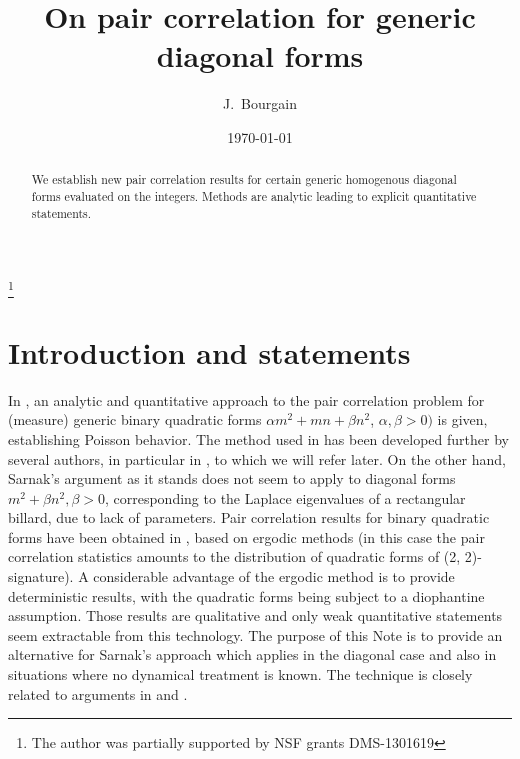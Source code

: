 \documentclass[12, eqno]{amsart}
\numberwithin{equation}{section}
\theoremstyle{remark}
\begin{document}
\title{On pair correlation for generic diagonal forms}
\date{\today}
\author{J.~Bourgain}
\address{J.~Bourgain, Institute for Advanced Study, Princeton, NJ 08540}
\thanks{The author was partially supported by NSF grants DMS-1301619}

\begin{abstract}
We establish new pair correlation results for certain generic homogenous diagonal forms evaluated on the integers. 
Methods are analytic leading to explicit quantitative statements.
\end{abstract}
\maketitle
\section {Introduction and statements}

In \cite {S}, an analytic and quantitative approach to the pair correlation problem for (measure) generic binary 
quadratic forms $\alpha m^2+mn+ \beta n^2$, $\alpha, \beta>0)$ is given, establishing Poisson behavior.
The method used in \cite {S}  has been developed further by several authors, in particular in \cite {V}, to which we will refer later.
On the other hand, Sarnak's argument as it stands does not seem to apply to diagonal forms $m^2+\beta n^2, \beta>0$, corresponding to the Laplace eigenvalues of a
rectangular billard, due to lack of parameters.
Pair correlation results for binary quadratic forms have been obtained in \cite{EMM}, based on ergodic methods \big(in this case the pair correlation statistics amounts to the
distribution of quadratic forms of (2, 2)-signature\big).
A considerable advantage of the ergodic method is to provide deterministic results, with the quadratic forms being subject to a diophantine assumption.
Those results are qualitative and only weak quantitative statements seem extractable from this technology.
The purpose of this Note is to provide an alternative for Sarnak's approach which applies in the diagonal case and also in situations where no dynamical treatment is
known.
The technique is closely related to arguments in \cite{BBRR} and \cite{B}.
\end{document}
